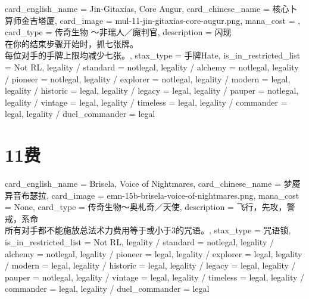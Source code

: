 \documentclass[lang = cn, color = black, 10pt]{AllThatStax}
\begin{document}
\card
{
	card_english_name = {Jin-Gitaxias, Core Augur},
	card_chinese_name = {核心卜算师金吉塔厦},
	card_image = mul-11-jin-gitaxias-core-augur.png,
	mana_cost = ,
	card_type = 传奇生物 ～非瑞人／魔判官,
	description = {闪现\\
		在你的结束步骤开始时，抓七张牌。\\
		每位对手的手牌上限均减少七张。},
	stax_type = 手牌Hate,
	is_in_restricted_list = Not RL,
	legality / standard = notlegal,
	legality / alchemy = notlegal,
	legality / pioneer = notlegal,
	legality / explorer = notlegal,
	legality / modern = legal,
	legality / historic = legal,
	legality / legacy = legal,
	legality / pauper = notlegal,
	legality / vintage = legal,
	legality / timeless = legal,
	legality / commander = legal,
	legality / duel_commander = legal
}

\chapter{11费}

\card
{
	card_english_name = {Brisela, Voice of Nightmares},
	card_chinese_name = {梦魇异音布瑟拉},
	card_image = emn-15b-brisela-voice-of-nightmares.png,
	mana_cost = None,
	card_type = 传奇生物～奥札奇／天使,
	description = {飞行，先攻，警戒，系命\\
		所有对手都不能施放总法术力费用等于或小于3的咒语。},
	stax_type = 咒语锁,
	is_in_restricted_list = Not RL,
	legality / standard = notlegal,
	legality / alchemy = notlegal,
	legality / pioneer = legal,
	legality / explorer = legal,
	legality / modern = legal,
	legality / historic = legal,
	legality / legacy = legal,
	legality / pauper = notlegal,
	legality / vintage = legal,
	legality / timeless = legal,
	legality / commander = legal,
	legality / duel_commander = legal
}
\end{document}
